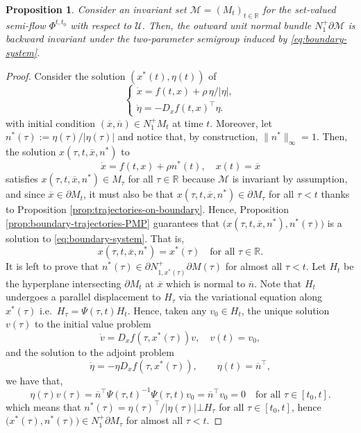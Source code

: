 \documentclass[reqno]{amsart}
\newtheorem{prop}[thm]{Proposition}
\theoremstyle{definition}
\numberwithin{equation}{section}
\newcommand{\R}{\mathbb{R}}
\newcommand{\M}{\mathscr{M}}
\newcommand{\U}{\mathcal{U}}
\begin{document}
\begin{prop}\label{prop:backward-invariance}
  Consider an invariant set $\M=(M_t)_{t\in\R}$ for the set-valued semi-flow $\Phi^{t,t_0}$ with respect to $\U$. Then, the outward unit normal bundle $N^+_1\partial \M$ is backward invariant under the two-parameter semigroup induced by \eqref{eq:boundary-system}.
 \end{prop}
 \begin{proof}
 Consider the solution $(x^*(t),\eta(t))$ of 
\[
     \begin{cases}
    \dot x=f(t,x)+\rho\,\eta/|\eta|,\\
    \dot \eta=-D_xf(t,x)^\top \eta.
\end{cases}
\]
with initial condition $(\overline x, \overline n)\in N^+_1 M_t$ at time $t$. 
Moreover, let $n^*(\tau):=\eta(\tau)/|\eta(\tau)|$ and notice that, by construction, $\|n^*\|_\infty=1$. Then, the solution $x(\tau,t, \overline x, n^*)$ to 
\[
\dot x= f(t,x)+\rho n^*(t), \quad x(t)=\overline x
\]
satisfies  $x(\tau,t, \overline x, n^*)\in M_\tau$ for all $\tau\in\R$ because $\M$ is invariant by assumption, and since $\overline x\in\partial M_t$, it must also be that $x(\tau,t, \overline x, n^*)\in \partial M_\tau$ for all $\tau<t$ thanks to Proposition \ref{prop:trajectories-on-boundary}. Hence, Proposition \ref{prop:boundary-trajectories-PMP} guarantees that $\big(x(\tau,t, \overline x, n^*),n^*(\tau)\big)$ is a solution to  \eqref{eq:boundary-system}. That is,
\[
x(\tau,t, \overline x, n^*)=x^*(\tau)\quad\text{for all }\tau\in\R.
\]
It is left to prove that $n^*(\tau)\in \partial N^+_{1,x^*(\tau)}\partial M(\tau)$ for almost all $\tau < t$.  
Let $H_{t}$ be the hyperplane intersecting $\partial M_t$ at $\overline x$ which is normal to $\overline n$. Note that $H_{t}$  undergoes a parallel displacement to $H_{\tau}$ via the variational equation along $x^*(\tau)$ i.e.~$H_\tau=\Psi(\tau,t)H_t$.
Hence, taken any $v_0\in H_t$, the unique solution $v(\tau)$ to the initial value problem 
     \[
     \dot v =D_xf(\tau,x^*(\tau))v,\quad v(t)=v_0,
     \]
     and the solution to the adjoint problem
    \[
    \dot \eta =-\eta D_xf(\tau,x^*(\tau)),\qquad \eta(t)=\overline n^\top,
    \]
    we have that,
    \[    \eta(\tau)v(\tau)=\overline n^\top\Psi(\tau,t)^{-1}\Psi(\tau,t)v_0=\overline n^\top v_0=0\quad\text{for all } \tau\in[t_0,t].
    \]
    which means that $n^*(\tau)=\eta(\tau)^\top/|\eta(\tau)|\bot H_\tau$ for all $\tau\in[t_0,t]$, hence $\big(x^*(\tau),n^*(\tau)\big)\in N^+_{1}\partial M_{\tau}$ for almost all $\tau < t$.
 \end{proof}
\end{document}
